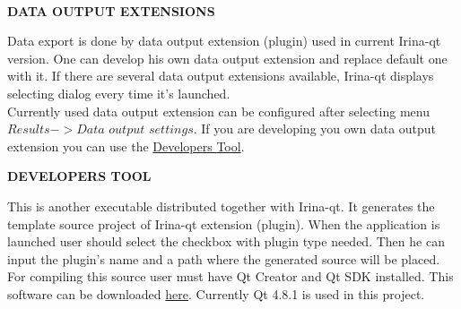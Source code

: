 \documentclass[a4paper]{article}
\begin{document}
\hypertarget{dataexport}{\\}
\begin{center}\textbf{DATA OUTPUT EXTENSIONS}\end{center}
{
Data export is done by data output extension (plugin) used in current Irina-qt version.
One can develop his own data output extension and replace default one with it.
If there are several data output extensions available, Irina-qt displays selecting dialog every time it's launched.
\\
Currently used data output extension can be configured after selecting menu $Results->Data$ $output$ $settings$.
If you are developing you own data output extension you can use the \hyperlink{devtool}{Developers Tool}.
}
\hypertarget{devtool}{\\}
\begin{center}\textbf{DEVELOPERS TOOL}\end{center}
{
This is another executable distributed together with Irina-qt.
It generates the template source project of Irina-qt extension (plugin).
When the application is launched user should select the checkbox with plugin type needed.
Then he can input the plugin's name and a path where the generated source will be placed.
For compiling this source user must have Qt Creator and Qt SDK installed.
This software can be downloaded \href{http://qt-project.org/downloads}{here}.
Currently Qt 4.8.1 is used in this project.
}
\end{document}
